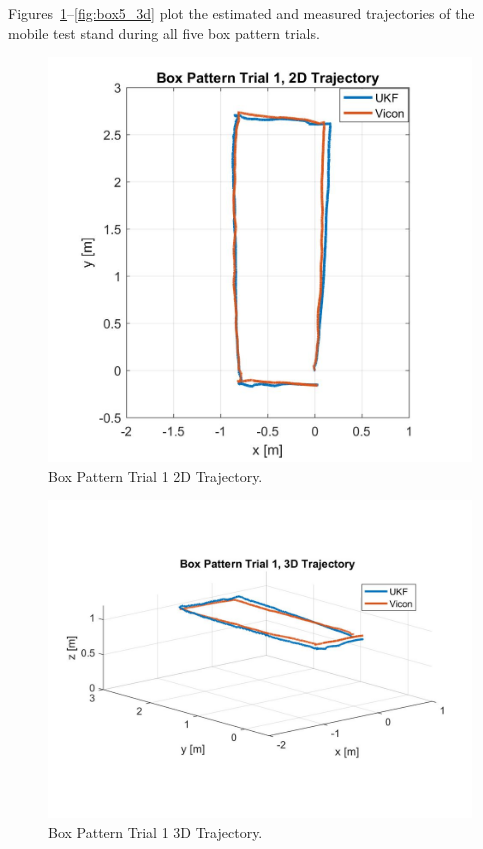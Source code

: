 Figures~\ref{fig:box1_2d}--\ref{fig:box5_3d} plot the estimated and measured trajectories of the mobile test stand during all five box pattern trials. 

\clearpage

\begin{figure}[p]
  \centering
    \includegraphics[height=0.6\textwidth]{box1_2d}
  \caption[Box Pattern Trial 1 2D Trajectory]{Box Pattern Trial 1 2D Trajectory.}
  \label{fig:box1_2d}
\end{figure}
\begin{figure}[p]
  \centering
    \includegraphics[height=0.7\textwidth]{box1_3d}
  \caption[Box Pattern Trial 1 3D Trajectory]{Box Pattern Trial 1 3D Trajectory.}
  \label{fig:box1_3d}
\end{figure}
\clearpage

